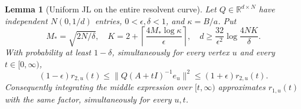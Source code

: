 \documentclass[11pt]{article}
\newtheorem{lemma}[theorem]{Lemma}
\newcommand{\R}{\mathbb R}
\begin{document}
\begin{lemma}[Uniform JL on the entire resolvent curve]\label{lem:continuum}
Let $Q\in\R^{d\times N}$ have independent $N(0,1/d)$ entries,
$0<\epsilon,\delta<1$, and $\kappa=B/a$. Put
\[
 M_*=\sqrt{2N/\delta},\quad
 K=2+\left\lceil\frac{4M_*\log\kappa}{\epsilon}\right\rceil,
 \quad d\geq\frac{32}{\epsilon^2}\log\frac{4NK}{\delta}.
\]
With probability at least $1-\delta$, simultaneously for every
vertex $u$ and every $t\in[0,\infty)$,
\begin{equation}\label{eq:continuumjl}
 (1-\epsilon)r_{2,u}(t)
 \leq\|Q(A+tI)^{-1}e_u\|^2
 \leq(1+\epsilon)r_{2,u}(t).
\end{equation}
Consequently integrating the middle expression over $[t,\infty)$
approximates $r_{1,u}(t)$ with the same factor, simultaneously for
every $u,t$.
\end{lemma}
\end{document}
